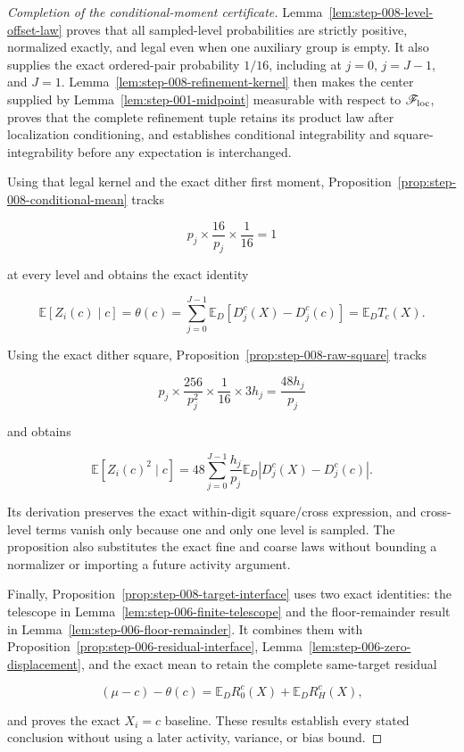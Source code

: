 \begin{proof}[Completion of the conditional-moment certificate]
Lemma~\ref{lem:step-008-level-offset-law} proves that all sampled-level probabilities are strictly positive, normalized exactly, and legal even when one auxiliary group is empty. It also supplies the exact ordered-pair probability \(1/16\), including at \(j=0\), \(j=J-1\), and \(J=1\). Lemma~\ref{lem:step-008-refinement-kernel} then makes the center supplied by Lemma~\ref{lem:step-001-midpoint} measurable with respect to \(\mathscr F_{\rm loc}\), proves that the complete refinement tuple retains its product law after localization conditioning, and establishes conditional integrability and square-integrability before any expectation is interchanged.

Using that legal kernel and the exact dither first moment, Proposition~\ref{prop:step-008-conditional-mean} tracks

\[
p_j\times\frac{16}{p_j}\times\frac1{16}=1
\]

at every level and obtains the exact identity

\[
\mathbb E[Z_i(c)\mid c]
=\theta(c)
=\sum_{j=0}^{J-1}\mathbb E_D[D_j^c(X)-D_j^c(c)]
=\mathbb E_DT_c(X).
\]

Using the exact dither square, Proposition~\ref{prop:step-008-raw-square} tracks

\[
p_j\times\frac{256}{p_j^2}\times\frac1{16}\times3h_j
=\frac{48h_j}{p_j}
\]

and obtains

\[
\mathbb E[Z_i(c)^2\mid c]
=48\sum_{j=0}^{J-1}\frac{h_j}{p_j}
\mathbb E_D|D_j^c(X)-D_j^c(c)|.
\]

Its derivation preserves the exact within-digit square/cross expression, and cross-level terms vanish only because one and only one level is sampled. The proposition also substitutes the exact fine and coarse laws without bounding a normalizer or importing a future activity argument.

Finally, Proposition~\ref{prop:step-008-target-interface} uses two exact
identities: the telescope in Lemma~\ref{lem:step-006-finite-telescope} and the
floor-remainder result in Lemma~\ref{lem:step-006-floor-remainder}. It combines
them with
Proposition~\ref{prop:step-006-residual-interface},
Lemma~\ref{lem:step-006-zero-displacement}, and the exact mean to retain the
complete same-target residual

\[
(\mu-c)-\theta(c)
=\mathbb E_D R_0^c(X)+\mathbb E_D R_H^c(X),
\]

and proves the exact \(X_i=c\) baseline. These results establish every stated
conclusion without using a later activity, variance, or bias bound.
\end{proof}

